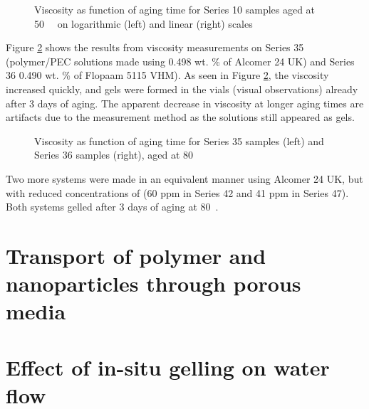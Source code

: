 \begin{figure}
    \centering
    \caption{Viscosity as function of aging time for Series 10 samples aged at 50~\celsius~ on logarithmic (left) and linear (right) scales}
    \label{cht:s10visc50}
\end{figure}

Figure \ref{cht:s3536visc} shows the results from viscosity measurements on Series 35 (polymer/PEC solutions made using 0.498 wt. \% of Alcomer 24 UK) and Series 36  0.490 wt. \% of Flopaam 5115 VHM). As seen in Figure \ref{cht:s3536visc}, the viscosity increased quickly, and gels were formed in the vials (visual observations) already after 3 days of aging. The apparent decrease in viscosity at longer aging times are artifacts due to the measurement method as the solutions still appeared as gels.

\begin{figure}
    \centering
    \caption{Viscosity as function of aging time for Series 35 samples (left) and Series 36 samples (right), aged at 80~\celsius}
    \label{cht:s3536visc}
\end{figure}

Two more systems were made in an equivalent manner using Alcomer 24 UK, but with reduced concentrations of  (60 ppm in Series 42 and 41 ppm in Series 47). Both systems gelled after 3 days of aging at 80~\celsius.


\section{Transport of polymer and nanoparticles through porous media}
\section{ Effect of in-situ gelling on water flow}